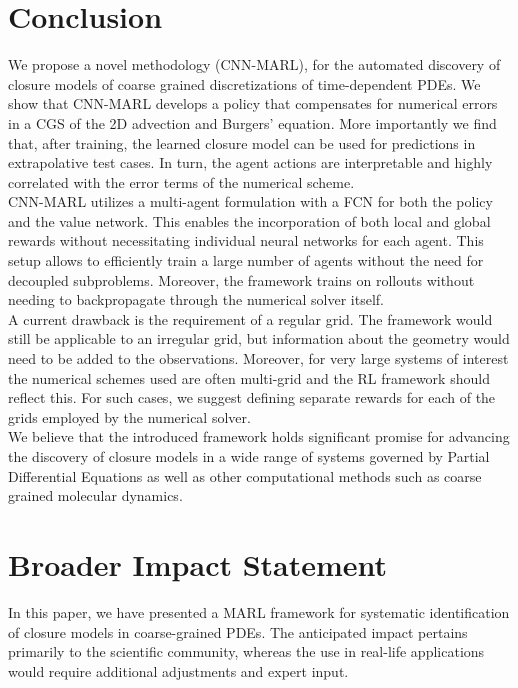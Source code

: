 \documentclass{article}
\theoremstyle{plain}
\theoremstyle{definition}
\theoremstyle{remark}
\begin{document}
\section{Conclusion}
We propose a novel methodology (CNN-MARL), for the automated discovery of closure models of coarse grained discretizations of  time-dependent PDEs. We show that CNN-MARL develops a  policy that compensates for numerical errors in a CGS of the 2D advection and Burgers' equation. More importantly we find that, after training, the learned closure model can be used for predictions in extrapolative test cases. In turn, the agent actions are interpretable and highly correlated with the error terms of the numerical scheme.\\
CNN-MARL utilizes a multi-agent formulation with a FCN for both the policy and the value network. This enables the incorporation of  both local and global rewards without necessitating individual neural networks for each agent. This setup allows to efficiently train a large number of agents without the need for decoupled subproblems. Moreover, the framework trains on rollouts without needing to backpropagate through the numerical solver itself.\\A current drawback is the requirement of a regular grid. The framework would still be applicable to an irregular grid, but information about the geometry would need to be added to the observations. Moreover, for very large systems of interest the numerical schemes used are often multi-grid and the 
RL framework should reflect this. For such cases, we suggest defining separate rewards for each of the grids employed by the numerical solver.\\
We believe that the introduced framework holds significant promise for advancing the discovery of closure models in a wide range of systems governed by Partial Differential Equations as well as  other computational methods such as  coarse grained molecular dynamics. 

\newpage
\section*{Broader Impact Statement}
In this paper, we have presented a MARL framework for systematic identification of closure models in coarse-grained PDEs. The anticipated impact pertains primarily to the scientific community, whereas the use in
real-life applications would require additional adjustments and expert input.





\newpage
\appendix
\onecolumn

\end{document}
